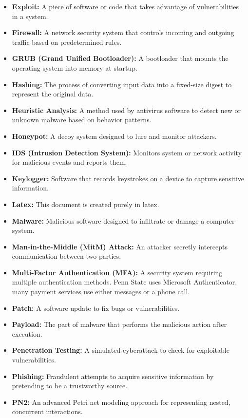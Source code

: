 \documentclass{article}
\begin{document}
\begin{itemize}
    \item \textbf{Exploit:} A piece of software or code that takes advantage of vulnerabilities in a system.
    \item \textbf{Firewall:} A network security system that controls incoming and outgoing traffic based on predetermined rules.
    \item \textbf{GRUB (Grand Unified Bootloader):} A bootloader that mounts the operating system into memory at startup.
    \item \textbf{Hashing:} The process of converting input data into a fixed-size digest to represent the original data.
    \item \textbf{Heuristic Analysis:} A method used by antivirus software to detect new or unknown malware based on behavior patterns.
    \item \textbf{Honeypot:} A decoy system designed to lure and monitor attackers.
    \item \textbf{IDS (Intrusion Detection System):} Monitors system or network activity for malicious events and reports them.
    \item \textbf{Keylogger:} Software that records keystrokes on a device to capture sensitive information.
    \item \textbf{Latex:} This document is created purely in latex.
    \item \textbf{Malware:} Malicious software designed to infiltrate or damage a computer system.
    \item \textbf{Man-in-the-Middle (MitM) Attack:} An attacker secretly intercepts communication between two parties.
    \item \textbf{Multi-Factor Authentication (MFA):} A security system requiring multiple authentication methods. Penn State uses Microsoft Authenticator, many payment services use either messages or a phone call.
    \item \textbf{Patch:} A software update to fix bugs or vulnerabilities.
    \item \textbf{Payload:} The part of malware that performs the malicious action after execution.
    \item \textbf{Penetration Testing:} A simulated cyberattack to check for exploitable vulnerabilities.
    \item \textbf{Phishing:} Fraudulent attempts to acquire sensitive information by pretending to be a trustworthy source.
    \item \textbf{PN2:} An advanced Petri net modeling approach for representing nested, concurrent interactions.

\end{itemize}
\end{document}
